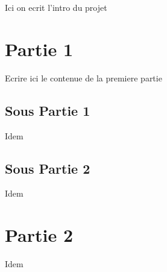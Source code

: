\documentclass[10pt,a4paper]{article} %
\begin{document}
    \title{\rmfamily\normalfont{}}
    \author{}
    \date{} %
    
    \maketitle
    Ici on ecrit l'intro du projet
    \tableofcontents
    
    \section{Partie 1}
    Ecrire ici le contenue de la premiere partie
    \subsection{Sous Partie 1}
    Idem
    \subsection{Sous Partie 2}
    Idem
    
    \section{Partie 2}
    Idem
    
\end{document}
